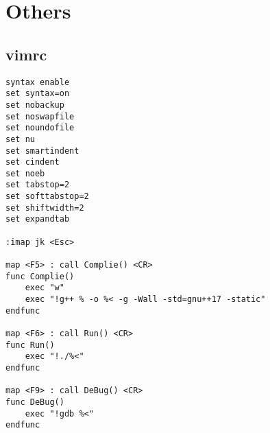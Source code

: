 \documentclass[twoside]{article}
\begin{document}
\section{Others}

\subsection{vimrc}
\begin{lstlisting}
syntax enable
set syntax=on
set nobackup
set noswapfile
set noundofile
set nu
set smartindent
set cindent
set noeb
set tabstop=2
set softtabstop=2
set shiftwidth=2
set expandtab 

:imap jk <Esc>

map <F5> : call Complie() <CR>
func Complie()
	exec "w"
	exec "!g++ % -o %< -g -Wall -std=gnu++17 -static"
endfunc

map <F6> : call Run() <CR>
func Run()
	exec "!./%<"
endfunc

map <F9> : call DeBug() <CR>
func DeBug()
	exec "!gdb %<"
endfunc

\end{lstlisting}
\end{document}
